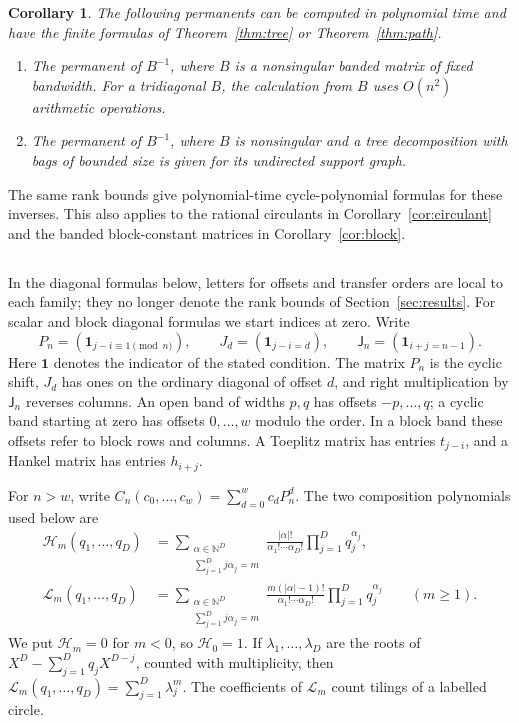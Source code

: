 \documentclass[11pt,reqno]{amsart}
\newtheorem{corollary}[theorem]{Corollary}
\theoremstyle{remark}
\numberwithin{equation}{section}
\newcommand{\N}{\mathbb N}
\newcommand{\cH}{\mathcal H}
\newcommand{\cL}{\mathcal L}
\newcommand{\ind}{\mathbf 1}
\begin{document}
\begin{corollary}\label{cor:inverse}
The following permanents can be computed in polynomial time and
have the finite formulas of Theorem~\ref{thm:tree} or
Theorem~\ref{thm:path}.
\begin{enumerate}
\item The permanent of \(B^{-1}\), where \(B\) is a nonsingular
  banded matrix of fixed bandwidth. For a tridiagonal \(B\), the
  calculation from \(B\) uses \(O(n^2)\) arithmetic operations.
\item The permanent of \(B^{-1}\), where \(B\) is nonsingular and a
  tree decomposition with bags of bounded size is given for its
  undirected support graph.
\end{enumerate}
\end{corollary}

The same rank bounds give polynomial-time cycle-polynomial
formulas for these inverses. This also applies to the rational
circulants in Corollary~\ref{cor:circulant} and the banded
block-constant matrices in Corollary~\ref{cor:block}.

\subsection{}

In the diagonal formulas below, letters for offsets and transfer
orders are local to each family; they no longer denote the rank
bounds of Section~\ref{sec:results}.
For scalar and block diagonal formulas we start indices at
zero. Write
\[
 P_n=(\ind_{j-i\equiv1\pmod n}),\qquad
 J_d=(\ind_{j-i=d}),\qquad
 \mathsf J_n=(\ind_{i+j=n-1}).
\]
Here \(\ind\) denotes the indicator of the stated condition.
The matrix \(P_n\) is the cyclic shift, \(J_d\) has ones on the
ordinary diagonal of offset \(d\), and right multiplication
by \(\mathsf J_n\) reverses columns. An open band of widths
\(p,q\) has offsets \(-p,\ldots,q\); a cyclic band starting at
zero has offsets \(0,\ldots,w\) modulo the order. In a block
band these offsets refer to block rows and columns. A
Toeplitz matrix has entries \(t_{j-i}\), and a Hankel matrix
has entries \(h_{i+j}\).

For \(n>w\), write \(C_n(c_0,\ldots,c_w)=\sum_{d=0}^w c_dP_n^d\).
The two composition polynomials used below are
\begin{align}
 \cH_m(q_1,\ldots,q_D)
  &=\sum_{\substack{\alpha\in\N^D\\ \sum_{j=1}^D j\alpha_j=m}}
       \frac{|\alpha|!}{\alpha_1!\cdots\alpha_D!}
       \prod_{j=1}^D q_j^{\alpha_j},\label{eq:hpoly}\\
 \cL_m(q_1,\ldots,q_D)
  &=\sum_{\substack{\alpha\in\N^D\\ \sum_{j=1}^D j\alpha_j=m}}
       \frac{m(|\alpha|-1)!}{\alpha_1!\cdots\alpha_D!}
       \prod_{j=1}^D q_j^{\alpha_j}\qquad(m\geq1).\label{eq:lpoly}
\end{align}
We put \(\cH_m=0\) for \(m<0\), so \(\cH_0=1\). If
\(\lambda_1,\ldots,\lambda_D\) are the roots of
\(X^D-\sum_{j=1}^D q_jX^{D-j}\), counted with multiplicity, then
\(\cL_m(q_1,\ldots,q_D)=\sum_{j=1}^D\lambda_j^m\).
The coefficients of \(\cL_m\) count tilings of a labelled circle.
\end{document}

